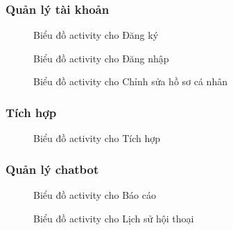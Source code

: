 \subsubsection{Quản lý tài khoản}
\begin{figure}[H]
    \centering
     
    \vspace{0.5cm}
    \caption{Biểu đồ activity cho Đăng ký}
    \label{fig:enter-label}
\end{figure}
\begin{figure}[H]
    \centering
     
    \vspace{0.5cm}
    \caption{Biểu đồ activity cho Đăng nhập}
    \label{fig:enter-label}
\end{figure}
\begin{figure}[H]
    \centering
     
    \vspace{0.5cm}
    \caption{Biểu đồ activity cho Chỉnh sửa hồ sơ cá nhân}
    \label{fig:enter-label}
\end{figure}
\subsubsection{Tích hợp}
\begin{figure}[H]
    \centering
     
    \vspace{0.5cm}
    \caption{Biểu đồ activity cho Tích hợp}
    \label{fig:enter-label}
\end{figure}
\subsubsection{Quản lý chatbot}
\begin{figure}[H]
    \centering
     
    \vspace{0.5cm}
    \caption{Biểu đồ activity cho Báo cáo}
    \label{fig:enter-label}
\end{figure}

\begin{figure}[H]
    \centering
     
    \vspace{0.5cm}
    \caption{Biểu đồ activity cho Lịch sử hội thoại}
    \label{fig:enter-label}
\end{figure}

